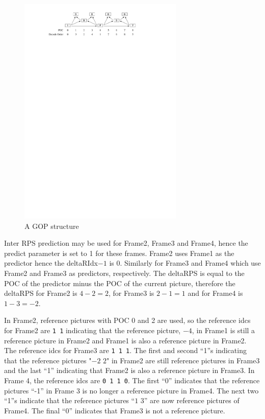 \documentclass[a4paper,11pt]{jctvcdoc}
\begin{document}
\begin{figure}[h]
\caption{A GOP structure}
\label{fig:gop-example}
\centering
\includegraphics[width=0.7\textwidth]{gop-structure-example}
\end{figure}

Inter RPS prediction may be used for Frame2, Frame3 and Frame4, hence
the predict parameter is set to 1 for these frames. Frame2 uses Frame1
as the predictor hence the deltaRIdx$-1$ is 0.  Similarly for Frame3 and
Frame4 which use Frame2 and Frame3 as predictors, respectively. The
deltaRPS is equal to the POC of the predictor minus the POC of the
current picture, therefore the deltaRPS for Frame2 is $4 -2 = 2$, for
Frame3 is $2 - 1 = 1$ and for Frame4 is $1 - 3 = -2$.

In Frame2, reference pictures with POC 0 and 2 are used, so the
reference idcs for Frame2 are \verb|1 1| indicating that the reference
picture, $-4$, in Frame1 is still a reference picture in Frame2 and
Frame1 is also a reference picture in Frame2. The reference idcs for
Frame3 are \verb|1 1 1|. The first and second “1”s indicating that
the reference pictures "$-2$ $2$" in Frame2 are still reference pictures in
Frame3 and the last “1” indicating that Frame2 is also a reference
picture in Frame3. In Frame 4, the reference idcs are \verb|0 1 1 0|.
The first “0” indicates that the reference pictures “-1” in Frame 3 is
no longer a reference picture in Frame4. The next two “1”s indicate that
the reference pictures “$1$ $3$” are now reference pictures of Frame4.
The final “0” indicates that Frame3 is not a reference picture.
\end{document}
